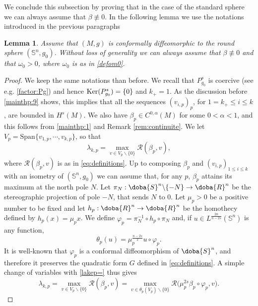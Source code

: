 \documentclass[10pt]{amsart}
\numberwithin{equation}{section}
\def\om{{\omega}}
\def\la{{\lambda}}
\def\phi{{\varphi}}
\gdef\mR{\doba{R}}
\gdef\mS{\doba{S}}
\def\ker{{\mathop{\rm Ker}}}
\newcommand{\vp}{\varphi}
\theoremstyle{plain}
\newtheorem{lemme}{Lemma}[section]%
\theoremstyle{remark}
\begin{document}
\medskip


We conclude this subsection by proving that in the case of the standard sphere we can always assume that $\beta \not \equiv 0$. In the following lemma we use the notations introduced in the previous paragraphs
\begin{lemme}  \label{om0sphere}
Assume that $(M,g)$ is conformally diffeomorphic to the round sphere $(\mathbb{S}^n, g_0)$. Without loss of generality we can always assume that $\beta \not \equiv 0$ and that $\om_0 >0$, where $\omega_0$ is as in \eqref{defom0}. 
\end{lemme}

\begin{proof}
We keep the same notations than before. We recall that $P_{g_0}^s$ is coercive (see e.g. \eqref{factor:Pg}) and hence $\ker (P_{g_0}^s) = \{0\}$ and $k_+ = 1$. As the discussion before \eqref{mainthp:9} shows, this implies that all the sequences $(v_{i,p})_p$, for $1 = k_+ \le i \le k$, are bounded in $H^s(M)$. We also have $\beta_p \in C^{0,\alpha}(M)$ for some $0 < \alpha <1$, and this follows from \eqref{mainthp:1} and Remark \ref{rem:continuite}. We let $V_p = \text{Span} \big\{v_{1,p} , \cdots, v_{k,p}\big \}$, so that 
\begin{equation} \label{lakep=} 
 \la_{k,p} = \max_{v \in V_p \backslash \{0\}}  \mathcal{R}(\beta_p, v),
\end{equation}
where $ \mathcal{R}(\beta_p, v)$ is as in \eqref{eq:definitions}. Up to composing $\beta_p$ and $(v_{i,p})_{1 \le i \le k}$ with an isometry of $(\mathbb{S}^n, g_0)$ we can assume that, for any $p$, $\beta_p$ attains its maximum at the north pole $N$. Let $\pi_N : \mS^n \backslash \{-N\} \to \mR^n$  
be the stereographic projection of pole $-N$, that sends $N$ to $0$. Let $\mu_p >0$ be a positive number to be fixed  and let  $h_p : \mR^n \to \mR^n$ be the homothecy defined by $h_p(x)= \mu_p x$. We define $\vp_p = \pi_N^{-1} \circ h_p \circ \pi_N$ and, if $u \in L^{\frac{2n}{n-2s}}(\mathbb{S}^n)$ is any function, 
$$\theta_p(u) = \mu_p^{\frac{n-2s}{2}} u \circ \phi_p. $$
It is well-known that $\phi_p$ is a conformal diffeomorphism of $\mS^n$, and therefore it preserves the quadratic form $G$ defined in \eqref{eq:definitions}. A simple change of variables with \eqref{lakep=} thus gives
\begin{equation} \label{transf_u}
\lambda_{k,p} = \max_{v \in V_p \backslash \{0\}}  \mathcal{R}(\beta_p, v) = \max_{v \in \theta_p(V_p) \backslash \{0\}}  \mathcal{R}\big(\mu_p^{2s} \beta_p\circ \vp_p, v \big)  .
\end{equation}

\end{proof}
\end{document}
